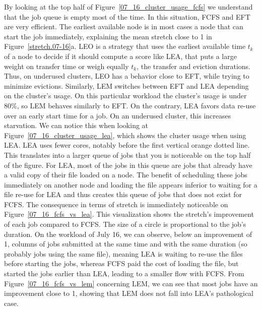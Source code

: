 \documentclass[conference,10pt]{IEEEtran}
\begin{document}
By looking at the top half of Figure~\ref{07_16_cluster_usage_fcfs}
we understand that the job queue is empty most of the time.
In this situation, FCFS and EFT are very efficient. The earliest available node is in
most cases a node that can start the job immediately, explaining the mean stretch close to 1 in Figure~\ref{stretch.07-16}a.
LEO is a strategy that uses the earliest available time $t_k$ of a node to decide if it should compute a score like LEA,
that puts a large weight on transfer time or weigh equally $t_k$, the transfer and eviction durations. 
Thus, on underused clusters, LEO has a behavior close to EFT, while trying to minimize evictions.
Similarly, LEM switches between EFT and LEA depending on the cluster's usage.
On this particular workload the cluster's usage is under 80\%, so LEM behaves similarly to EFT.
On the contrary, LEA favors data re-use over an early start time for a job.
On an underused cluster, this increases starvation.
We can notice this when looking at
Figure~\ref{07_16_cluster_usage_lea}, which shows the cluster usage when using LEA.
LEA uses fewer cores, notably before the first vertical orange dotted line. 
This translates into a larger queue of jobs that you is noticeable on the top half of the figure.
For LEA, most of the jobs in this queue are jobs that already have a valid copy of their file loaded on a node. 
The benefit of scheduling these jobs immediately on another node and loading the file appears
inferior to waiting for a file re-use for LEA and thus creates this queue of jobs that does not exist for FCFS. 
The consequence in terms of stretch is immediately noticeable on Figure~\ref{07_16_fcfs_vs_lea}.
This visualization shows the stretch's improvement of each job compared to FCFS.
The size of a circle is proportional to the job's duration.
On the workload of July 16, we can observe, below an improvement of 1, columns of jobs submitted at the same time and
with the same duration (so probably jobs using the same file),
meaning LEA is waiting to re-use the files before starting the jobs,
whereas FCFS paid the cost of loading the file, but started the jobs
earlier than LEA, leading to a 
smaller flow with FCFS.
From Figure~\ref{07_16_fcfs_vs_lem} concerning LEM, we can see that most jobs have an improvement close to 1, showing 
that LEM does not fall into LEA's pathological case.
\end{document}
